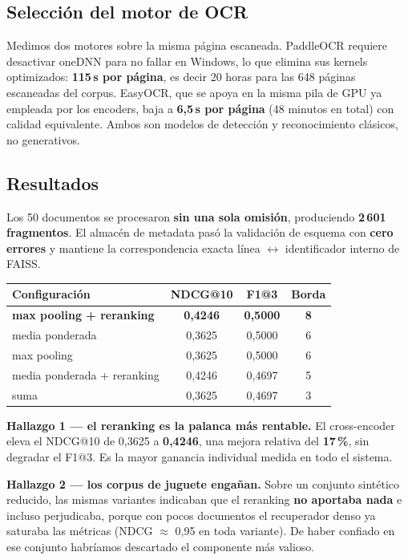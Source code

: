 \documentclass[10pt,a4paper]{article}
\begin{document}
\subsection{Selección del motor de OCR}

Medimos dos motores sobre la misma página escaneada. PaddleOCR requiere desactivar oneDNN para no
fallar en Windows, lo que elimina sus kernels optimizados: \textbf{115\,s por página}, es decir
20 horas para las 648 páginas escaneadas del corpus. EasyOCR, que se apoya en la misma pila de
GPU ya empleada por los encoders, baja a \textbf{6,5\,s por página} (48 minutos en total) con
calidad equivalente. Ambos son modelos de detección y reconocimiento clásicos, no generativos.

\subsection{Resultados}

Los 50 documentos se procesaron \textbf{sin una sola omisión}, produciendo \textbf{2\,601
fragmentos}. El almacén de metadata pasó la validación de esquema con \textbf{cero errores} y
mantiene la correspondencia exacta línea $\leftrightarrow$ identificador interno de FAISS.

\begin{center}\small
\begin{tabular}{@{}lccc@{}}
\toprule
\textbf{Configuración} & \textbf{NDCG@10} & \textbf{F1@3} & \textbf{Borda} \\
\midrule
\textbf{max pooling + reranking} & \textbf{0,4246} & \textbf{0,5000} & \textbf{8} \\
media ponderada & 0,3625 & 0,5000 & 6 \\
max pooling & 0,3625 & 0,5000 & 6 \\
media ponderada + reranking & 0,4246 & 0,4697 & 5 \\
suma & 0,3625 & 0,4697 & 3 \\
\bottomrule
\end{tabular}
\end{center}

\textbf{Hallazgo 1 — el reranking es la palanca más rentable.} El cross-encoder eleva el NDCG@10 de
0,3625 a \textbf{0,4246}, una mejora relativa del \textbf{17\,\%}, sin degradar el F1@3. Es la
mayor ganancia individual medida en todo el sistema.

\textbf{Hallazgo 2 — los corpus de juguete engañan.} Sobre un conjunto sintético reducido, las
mismas variantes indicaban que el reranking \textbf{no aportaba nada} e incluso perjudicaba, porque
con pocos documentos el recuperador denso ya saturaba las métricas (NDCG $\approx$ 0,95 en toda
variante). De haber confiado en ese conjunto habríamos descartado el componente más valioso.
\end{document}
